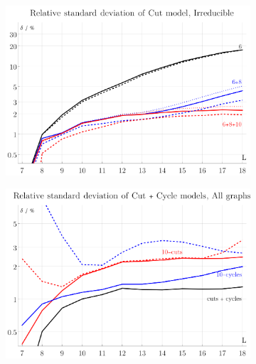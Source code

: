 \documentclass[12pt]{article}
\numberwithin{equation}{section}
\begin{document}
\begin{figure}[htb]

	\begin{subfigure}{ .49 \linewidth}
		\centering
		\includegraphics[width=\linewidth]{figures/cut_standard_deviation}
		\subcaption{}
		\label{fig:cut_relative_standard_deviation}
	\end{subfigure}
		\begin{subfigure}{ .49 \linewidth}
		\centering
		\includegraphics[width=\linewidth]{figures/cut_cycle_reducible}
		\subcaption{}
		\label{fig:cut_cycle_relative_standard_deviation_reducible}
	\end{subfigure}
	

\end{figure}
\end{document}
